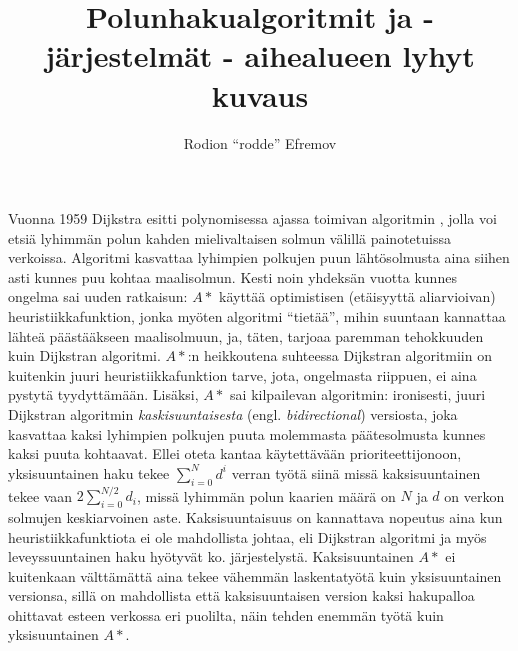 \documentclass[10pt]{article}
\title{Polunhakualgoritmit ja -järjestelmät - aihealueen lyhyt kuvaus}
\author{Rodion ``rodde'' Efremov}
\begin{document}
 \maketitle
 
\noindent Vuonna 1959 Dijkstra esitti polynomisessa ajassa toimivan algoritmin \cite{Dijkstra59}, jolla voi etsiä lyhimmän polun kahden mielivaltaisen solmun välillä painotetuissa verkoissa. Algoritmi kasvattaa lyhimpien polkujen puun lähtösolmusta aina siihen asti kunnes puu kohtaa maalisolmun. Kesti noin yhdeksän vuotta kunnes ongelma sai uuden ratkaisun: $A\ast$ \cite{Hart68} käyttää optimistisen (etäisyyttä aliarvioivan) heuristiikkafunktion, jonka myöten algoritmi ``tietää'', mihin suuntaan kannattaa lähteä päästääkseen maalisolmuun, ja, täten, tarjoaa paremman tehokkuuden kuin Dijkstran algoritmi. $A\ast$:n heikkoutena suhteessa Dijkstran algoritmiin on kuitenkin juuri heuristiikkafunktion tarve, jota, ongelmasta riippuen, ei aina pystytä tyydyttämään. Lisäksi, $A\ast$ sai kilpailevan algoritmin: ironisesti, juuri Dijkstran algoritmin \textit{kaskisuuntaisesta} (engl. \textit{bidirectional}) versiosta, joka kasvattaa kaksi lyhimpien polkujen puuta molemmasta päätesolmusta kunnes kaksi puuta kohtaavat. Ellei oteta kantaa käytettävään prioriteettijonoon, yksisuuntainen haku tekee $\sum_{i = 0}^N d^i$ verran työtä siinä missä kaksisuuntainen tekee vaan $2\sum_{i = 0}^{N/2} d_i$, missä lyhimmän polun kaarien määrä on $N$ ja $d$ on verkon solmujen keskiarvoinen aste. Kaksisuuntaisuus on kannattava nopeutus aina kun heuristiikkafunktiota ei ole mahdollista johtaa, eli Dijkstran algoritmi ja myös leveyssuuntainen haku hyötyvät ko. järjestelystä. Kaksisuuntainen $A\ast$ ei kuitenkaan välttämättä aina tekee vähemmän laskentatyötä kuin yksisuuntainen versionsa, sillä on mahdollista että kaksisuuntaisen version kaksi hakupalloa ohittavat esteen verkossa eri puolilta, näin tehden enemmän työtä kuin yksisuuntainen $A\ast$.
\vspace{0.5em}
\end{document}
